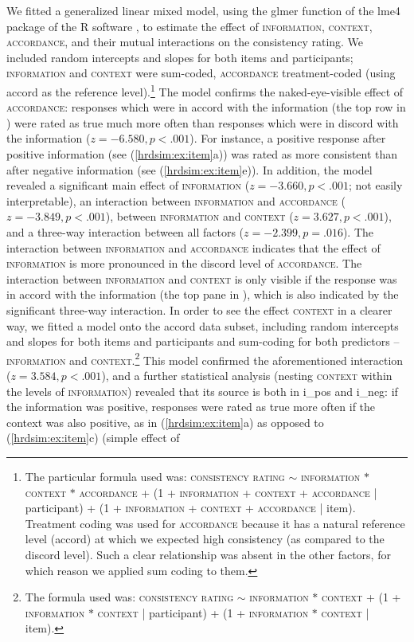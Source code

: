 \documentclass[output=paper,colorlinks,citecolor=brown]{langscibook}
\begin{document}
We fitted a generalized linear mixed model, using the glmer function of the lme4 package \citep{Bates.etal2015} of the R software \citep{rcore}, to estimate the effect of \textsc{information, context, accordance,} and their mutual interactions on the consistency rating. We included random intercepts and slopes for both items and participants; \textsc{information} and \textsc{context} were sum-coded, \textsc{accordance} treatment-coded (using \textsf{accord} as the reference level).\footnote{The particular formula used was: \textsc{consistency rating} $\sim$ \textsc{information} $*$ \textsc{context} $*$ \textsc{accordance} + (1 + \textsc{information} + \textsc{context} + \textsc{accordance} | participant) + (1 + \textsc{information} + \textsc{context} + \textsc{accordance} | item). Treatment coding was used for \textsc{accordance} because it has a natural reference level (\textsf{accord}) at which we expected high consistency (as compared to the \textsf{discord} level). Such a clear relationship was absent in the other factors, for which reason we applied sum coding to them.\label{hrdsim:fn:coding}} The model confirms the naked-eye-visible effect of \textsc{accordance}: responses which were in accord with the information (the top row in ) were rated as true much more often than responses which were in discord with the information ($z=-6.580,p<.001$). For instance, a positive response after positive information (see (\ref{hrdsim:ex:item}a)) was rated as more consistent than after negative information (see (\ref{hrdsim:ex:item}e)). In addition, the model revealed a significant main effect of \textsc{information} ($z=-3.660,p<.001$; not easily interpretable), an interaction between \textsc{information} and \textsc{accordance} ($z=-3.849,p<.001$), between \textsc{information} and \textsc{context} ($z=3.627,p<.001$), and a three-way interaction between all factors ($z=-2.399,p=.016$). The interaction between \textsc{information} and \textsc{accordance} indicates that the effect of \textsc{information} is more pronounced in the \textsf{discord} level of \textsc{accordance}. The interaction between \textsc{information} and \textsc{context} is only visible if the response was in accord with the information (the top pane in ), which is also indicated by the significant three-way interaction. In order to see the effect \textsc{context} in a clearer way, we fitted a model onto the \textsf{accord} data subset, including random intercepts and slopes for both items and participants and sum-coding for both predictors -- \textsc{information} and \textsc{context}.\footnote{The formula used was: \textsc{consistency rating} $\sim$ \textsc{information} $*$ \textsc{context} + (1 + \textsc{information} $*$ \textsc{context} | participant) + (1 + \textsc{information} $*$ \textsc{context} | item).} This model confirmed the aforementioned interaction ($z=3.584,p<.001$), and a further statistical analysis (nesting \textsc{context} within the levels of \textsc{information}) revealed that its source is both in \textsf{i\_pos} and \textsf{i\_neg}: if the information was positive, responses were rated as true more often if the context was also positive, as in (\ref{hrdsim:ex:item}a) as opposed to (\ref{hrdsim:ex:item}c) (simple effect of 
\end{document}
